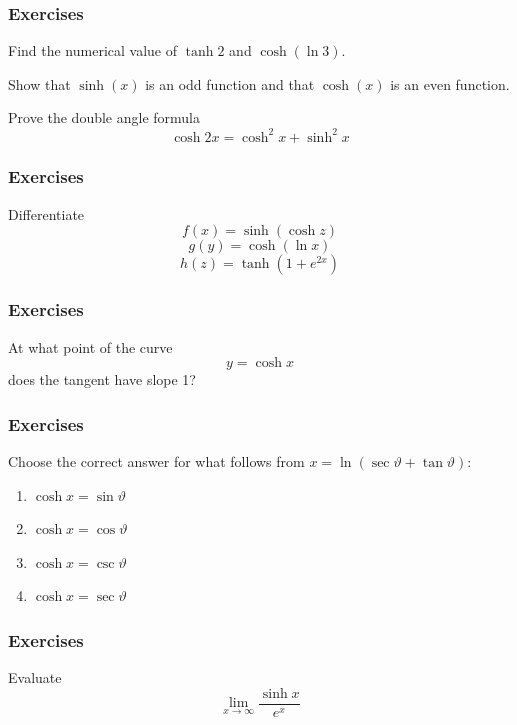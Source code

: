 \documentclass[xcolor=dvipsnames]{beamer}
\begin{document}
\begin{frame}
  \frametitle{Exercises}
{\ubung} Find the numerical value of $\tanh{}2$ and $\cosh(\ln{}3)$.

\medskip

{\ubung} Show that $\sinh(x)$ is an odd function and that $\cosh(x)$
is an even function.

\medskip

{\ubung} Prove the double angle formula
\begin{equation}
  \label{eq:chieshah}
  \cosh{}2x=\cosh^{2}x+\sinh^{2}x
\end{equation}
\end{frame}

\begin{frame}
  \frametitle{Exercises}
{\ubung} Differentiate
\begin{equation}
  \label{eq:sahwiesh}
  f(x)=\sinh(\cosh{}z)
\end{equation}
\begin{equation}
  \label{eq:gaitocee}
  g(y)=\cosh(\ln{}x)
\end{equation}
\begin{equation}
  \label{eq:pasaanee}
  h(z)=\tanh(1+e^{2x})
\end{equation}
\end{frame}

\begin{frame}
  \frametitle{Exercises}
{\ubung} At what point of the curve
\begin{equation}
  \label{eq:geipaifo}
  y=\cosh{}x
\end{equation}
does the tangent have slope 1?
\end{frame}

\begin{frame}
  \frametitle{Exercises}
{\ubung} 
Choose the correct answer for what follows from $x=\ln(\sec\vartheta+\tan\vartheta)$:
\begin{enumerate}
\item $\cosh{}x=\sin\vartheta$
\item $\cosh{}x=\cos\vartheta$
\item $\cosh{}x=\csc\vartheta$
\item $\cosh{}x=\sec\vartheta$
\end{enumerate}
\end{frame}

\begin{frame}
  \frametitle{Exercises}
{\ubung} Evaluate
\begin{equation}
  \label{eq:ielaicah}
  \lim_{x\rightarrow\infty}\frac{\sinh{}x}{e^{x}}
\end{equation}
\end{frame}
\end{document}
